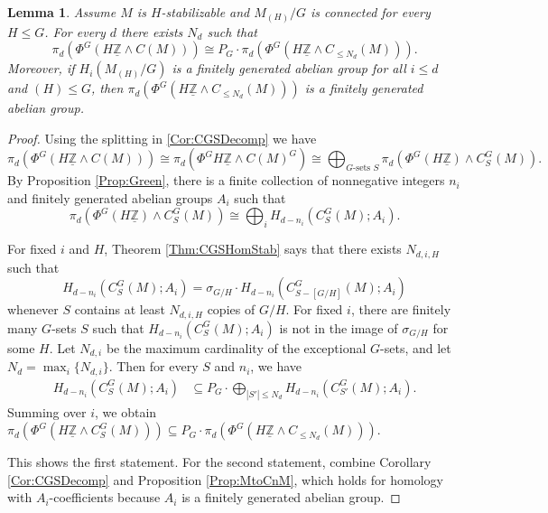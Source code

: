 \documentclass[11pt]{amsart}
\newtheorem{lemma}[equation]{Lemma}
\theoremstyle{definition}
\numberwithin{equation}{subsection} %
\newcommand{\sm}{\wedge}
\newcommand{\isom}{\cong}
\newcommand{\Z}{\mathbb{Z}}
\begin{document}
\begin{lemma} \label{lem:PhiG-generated}
Assume $M$ is $H$-stabilizable and $M_{(H)}/G$ is connected for every $H\leq G$. For every $d$ there exists $N_d$ such that
$$ \pi_d(\Phi^G(H\underline{\Z}\sm C(M))) \isom P_G\cdot
\pi_d(\Phi^G(H\underline{\Z}\sm C_{\leq N_d}(M))). $$
Moreover, if $H_i(M_{(H)}/G)$ is a finitely generated abelian group for all $i\leq d$ and $(H)\leq G$, then
$\pi_d(\Phi^G(H\underline{\Z}\sm C_{\leq N_d}(M)))$ is a finitely generated abelian group.
\end{lemma}
\begin{proof}
Using the splitting in \cref{Cor:CGSDecomp} we have
\[
\pi_d(\Phi^G(H\underline{\Z}\sm C(M))) \isom \pi_d(\Phi^GH\underline{\Z}\sm C(M)^G)
\isom \bigoplus_{G\text{-sets }S} \pi_d(\Phi^G(H\underline{\Z})\sm C_S^G(M)).
\]
By Proposition \ref{Prop:Green}, there is a finite collection of nonnegative integers $n_i$ and finitely generated abelian groups $A_i$ such that 
\[ \pi_d(\Phi^G(H\underline{\Z})\sm C_S^G(M))\isom \bigoplus_{i} H_{d-n_i}(C_S^G(M); A_i). \]

For fixed $i$ and $H$, Theorem \ref{Thm:CGSHomStab} says that there exists
$N_{d,i,H}$ such that
$$H_{d-n_i}(C_S^G(M); A_i) = \sigma_{G/H}\cdot H_{d-n_i}(C_{S-[G/H]}^G(M);
A_i) $$
whenever $S$ contains at least $N_{d,i,H}$ copies of $G/H$. For fixed $i$, there
are finitely many $G$-sets $S$ such that $H_{d-n_i}(C_S^G(M);A_i)$ is not in the
image of $\sigma_{G/H}$ for some $H$. Let $N_{d,i}$ be the maximum cardinality
of the exceptional $G$-sets, and
let $N_d = \max_i\{ N_{d,i} \}$. Then for every $S$ and $n_i$, we have
\begin{align*}
H_{d-n_i}(C_S^G(M); A_i) &\subseteq P_G\cdot \bigoplus_{|S'| \leq N_d} H_{d-n_i}(C_{S'}^G(M); A_i).
\end{align*}
Summing over $i$, we obtain $\pi_d(\Phi^G(H\underline{\Z}\sm C^G_S(M)))\subseteq
P_G \cdot \pi_d(\Phi^G(H\underline{\Z}\sm C_{\leq N_d}(M)))$.

This shows the first statement. For the second statement, combine Corollary \ref{Cor:CGSDecomp} and Proposition \ref{Prop:MtoCnM}, which holds for homology with $A_i$-coefficients because $A_i$ is a finitely generated abelian group.
\end{proof}
\end{document}
